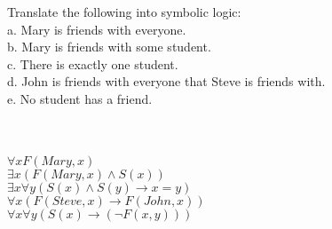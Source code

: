Translate the following into symbolic logic:\\

a. Mary is friends with everyone.\\

b. Mary is friends with some student.\\

c. There is exactly one student.\\

d. John is friends with everyone that Steve is friends with.\\

e. No student has a friend.\\\\

\begin{solution}\renewcommand{\qedsymbol}{}\ \\
    $\forall xF(Mary,x)$\\

    $\exists x(F(Mary,x)\land S(x))$\\

    $\exists x\forall y(S(x)\land S(y)\rightarrow x=y)$\\

    $\forall x(F(Steve,x)\rightarrow F(John,x))$\\

    $\forall x\forall y(S(x)\rightarrow (\neg F(x,y)))$

\end{solution}